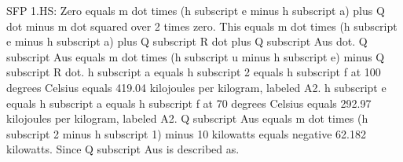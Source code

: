 SFP 1.HS:
Zero equals m dot times (h subscript e minus h subscript a) plus Q dot minus m dot squared over 2 times zero.
This equals m dot times (h subscript e minus h subscript a) plus Q subscript R dot plus Q subscript Aus dot.
Q subscript Aus equals m dot times (h subscript u minus h subscript e) minus Q subscript R dot.
h subscript a equals h subscript 2 equals h subscript f at 100 degrees Celsius equals 419.04 kilojoules per kilogram, labeled A2.
h subscript e equals h subscript a equals h subscript f at 70 degrees Celsius equals 292.97 kilojoules per kilogram, labeled A2.
Q subscript Aus equals m dot times (h subscript 2 minus h subscript 1) minus 10 kilowatts equals negative 62.182 kilowatts.
Since Q subscript Aus is described as.